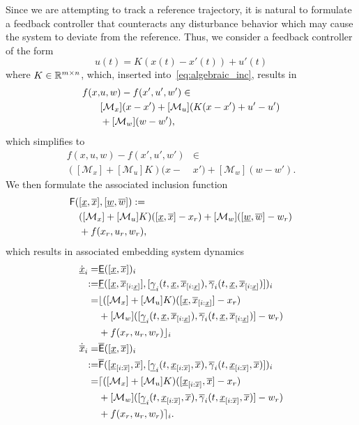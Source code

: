 \documentclass{IEEEojcsys}
\newcommand{\ul}{\underline}
\newcommand{\ol}{\overline}
\begin{document}
Since we are attempting to track a reference trajectory, it is natural to formulate a feedback controller that counteracts any disturbance behavior which may cause the system to deviate from the reference. Thus, we consider a feedback controller of the form
\begin{equation}
\label{eq:feedback_controller}
    u(t) = K(x(t) - x'(t)) + u'(t)
\end{equation}
where $K\in\mathbb{R}^{m\times n}$, which, inserted into~\eqref{eq:algebraic_inc}, results in
\begin{align}
\begin{aligned} 
    f(x,&u,w) - f(x',u',w') \in\\ 
    &[\mathcal{M}_x](x - x') + [\mathcal{M}_u](K(x - x') + u' - u')\\
    &+[\mathcal{M}_w](w - w'),
\end{aligned}
\end{align}
which simplifies to
\begin{align} 
    f(x, u, w) - f(x', u', w') &\in  \label{eq:intermediate_distemb}\\
    ([\mathcal{M}_x] + [\mathcal{M}_u]K)(x - &x') + [\mathcal{M}_w](w - w'). \nonumber
\end{align}
We then formulate the associated inclusion function
\begin{align}
    \sfF(&[\ul{x}, \ol{x}], [\ul{w}, \ol{w}]) := \label{eq:closedloop_inc}\\
    &([\mathcal{M}_x]+[\mathcal{M}_u]K)([\ulx, \olx] - x_r)
    + [\mathcal{M}_w]([\ul{w}, \ol{w}] - w_r)  \nonumber\\
    &+ f(x_r, u_r, w_r), \nonumber
\end{align}
which results in associated embedding system dynamics
\begin{align}
    \dot{\ul{x}}_i= &\ul{\sfE}([\ul{x}, \ol{x}])_i \label{eq:K_mixed_emb_lower}\\
    := &\ul{\sfF}([\ul{x}, \ol{x}_{[i:\ul{x}]}], [\ul{\gamma}_i(t, \ul{x}, \ol{x}_{[i:\ul{x}]}), \ol{\gamma}_i(t, \ul{x}, \ol{x}_{[i:\ul{x}]})])_i\nonumber\\
    =&\lfloor([\mathcal{M}_x] + [\mathcal{M}_u]K)([\ulx, \olx_{[i:\ul{x}]}] - x_r) \nonumber\\
     &+ [\mathcal{M}_w]([\ul{\gamma}_i(t, \ul{x}, \ol{x}_{[i:\ul{x}]}), \ol{\gamma}_i(t, \ul{x}, \ol{x}_{[i:\ul{x}]})] - w_r) \nonumber \\
     &+ f(x_r, u_r, w_r)\rfloor_i\nonumber \\
    \dot{\ol{x}}_i= &\ol{\sfE}([\ul{x}, \ol{x}])_i \label{eq:K_mixed_emb_upper}\\
    := &\ol{\sfF}([\ul{x}_{[i:\ol{x}]}, \ol{x}],[\ul{\gamma}_i(t, \ul{x}_{[i:\ol{x}]}, \ol{x}), \ol{\gamma}_i(t, \ul{x}_{[i:\ol{x}]}, \ol{x})])_i\nonumber \\
    =&\lceil([\mathcal{M}_x] + [\mathcal{M}_u]K)([\ulx_{[i:\ol{x}]}, \olx] - x_r) \nonumber\\
     &+ [\mathcal{M}_w]([\ul{\gamma}_i(t, \ul{x}_{[i:\ol{x}]}, \ol{x}), \ol{\gamma}_i(t, \ul{x}_{[i:\ol{x}]}, \ol{x})] - w_r) \nonumber \\
     &+ f(x_r, u_r, w_r)\rceil_i.\nonumber
\end{align}
\end{document}
